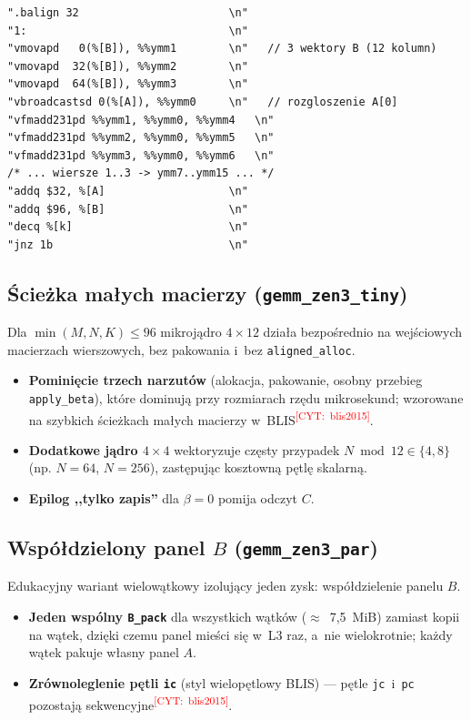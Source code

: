 \documentclass[a4paper,12pt]{book} %
\newcommand{\todocite}[1]{\textsuperscript{\textcolor{red}{[CYT:~#1]}}}
\newcommand{\kod}[1]{\texttt{#1}}
\begin{document}
\begin{lstfloat}[htbp]
\begin{lstlisting}[caption={Fragment pętli $K$ mikrojądra $4\times12$ we wstawce asemblerowej; akumulatory są przypięte do \kod{ymm4}--\kod{ymm15} (\kod{gemm\_zen3.c}).}, label={lst:ukr4x12}]
".balign 32                       \n"
"1:                               \n"
"vmovapd   0(%[B]), %%ymm1        \n"   // 3 wektory B (12 kolumn)
"vmovapd  32(%[B]), %%ymm2        \n"
"vmovapd  64(%[B]), %%ymm3        \n"
"vbroadcastsd 0(%[A]), %%ymm0     \n"   // rozgloszenie A[0]
"vfmadd231pd %%ymm1, %%ymm0, %%ymm4   \n"
"vfmadd231pd %%ymm2, %%ymm0, %%ymm5   \n"
"vfmadd231pd %%ymm3, %%ymm0, %%ymm6   \n"
/* ... wiersze 1..3 -> ymm7..ymm15 ... */
"addq $32, %[A]                   \n"
"addq $96, %[B]                   \n"
"decq %[k]                        \n"
"jnz 1b                           \n"
\end{lstlisting}
\end{lstfloat}

\subsection{Ścieżka małych macierzy (\kod{gemm\_zen3\_tiny})}
Dla \mbox{$\min(M,N,K)\le 96$} mikrojądro $4\times12$ działa bezpośrednio na
wejściowych macierzach wierszowych, bez pakowania i~bez \kod{aligned\_alloc}.
\begin{itemize}
\item \textbf{Pominięcie trzech narzutów} (alokacja, pakowanie, osobny przebieg
  \kod{apply\_beta}), które dominują przy rozmiarach rzędu mikrosekund; wzorowane
  na szybkich ścieżkach małych macierzy w~BLIS\todocite{blis2015}.
\item \textbf{Dodatkowe jądro $4\times4$} wektoryzuje częsty przypadek
  $N\bmod 12\in\{4,8\}$ (np. $N=64$, $N=256$), zastępując kosztowną pętlę
  skalarną.
\item \textbf{Epilog ,,tylko zapis''} dla $\beta=0$ pomija odczyt $C$.
\end{itemize}

\subsection{Współdzielony panel $B$ (\kod{gemm\_zen3\_par})}
Edukacyjny wariant wielowątkowy izolujący jeden zysk: współdzielenie panelu $B$.
\begin{itemize}
\item \textbf{Jeden wspólny \kod{B\_pack}} dla wszystkich wątków
  ($\approx$~7,5~MiB) zamiast kopii na wątek, dzięki czemu panel mieści się w~L3
  raz, a~nie wielokrotnie; każdy wątek pakuje własny panel $A$.
\item \textbf{Zrównoleglenie pętli \kod{ic}} (styl wielopętlowy BLIS) ---
  pętle \kod{jc}~i~\kod{pc} pozostają sekwencyjne\todocite{blis2015}.
\end{itemize}
\end{document}

